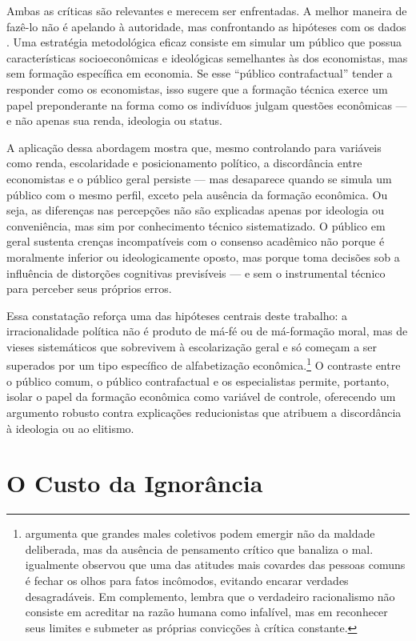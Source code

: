 Ambas as críticas são relevantes e merecem ser enfrentadas. A melhor maneira de fazê-lo não é apelando à autoridade, mas confrontando as hipóteses com os dados \cite{popperlogic}. Uma estratégia metodológica eficaz consiste em simular um público que possua características socioeconômicas e ideológicas semelhantes às dos economistas, mas sem formação específica em economia. Se esse “público contrafactual” tender a responder como os economistas, isso sugere que a formação técnica exerce um papel preponderante na forma como os indivíduos julgam questões econômicas — e não apenas sua renda, ideologia ou status.

A aplicação dessa abordagem mostra que, mesmo controlando para variáveis como renda, escolaridade e posicionamento político, a discordância entre economistas e o público geral persiste — mas desaparece quando se simula um público com o mesmo perfil, exceto pela ausência da formação econômica. Ou seja, as diferenças nas percepções não são explicadas apenas por ideologia ou conveniência, mas sim por conhecimento técnico sistematizado. O público em geral sustenta crenças incompatíveis com o consenso acadêmico não porque é moralmente inferior ou ideologicamente oposto, mas porque toma decisões sob a influência de distorções cognitivas previsíveis — e sem o instrumental técnico para perceber seus próprios erros.

Essa constatação reforça uma das hipóteses centrais deste trabalho: a irracionalidade política não é produto de má-fé ou de má-formação moral, mas de vieses sistemáticos que sobrevivem à escolarização geral e só começam a ser superados por um tipo específico de alfabetização econômica.\footnote{ argumenta que grandes males coletivos podem emergir não da maldade deliberada, mas da ausência de pensamento crítico que banaliza o mal.  igualmente observou que uma das atitudes mais covardes das pessoas comuns é fechar os olhos para fatos incômodos, evitando encarar verdades desagradáveis. Em complemento,  lembra que o verdadeiro racionalismo não consiste em acreditar na razão humana como infalível, mas em reconhecer seus limites e submeter as próprias convicções à crítica constante.}
 O contraste entre o público comum, o público contrafactual e os especialistas permite, portanto, isolar o papel da formação econômica como variável de controle, oferecendo um argumento robusto contra explicações reducionistas que atribuem a discordância à ideologia ou ao elitismo.

\section{O Custo da Ignorância} %

